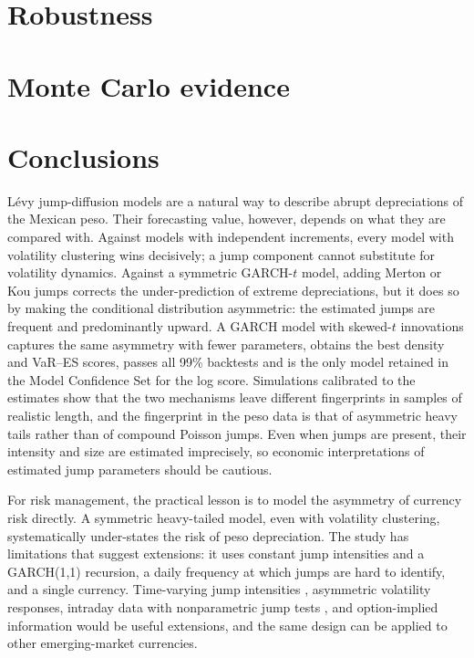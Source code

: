 \documentclass[11pt]{article}
\begin{document}
\section{Robustness}\label{sec:robust}



\section{Monte Carlo evidence}\label{sec:mc}



\section{Conclusions}\label{sec:conclusion}

Lévy jump-diffusion models are a natural way to describe abrupt depreciations of the Mexican peso. Their forecasting value, however, depends on what they are compared with. Against models with independent increments, every model with volatility clustering wins decisively; a jump component cannot substitute for volatility dynamics. Against a symmetric GARCH-$t$ model, adding Merton or Kou jumps corrects the under-prediction of extreme depreciations, but it does so by making the conditional distribution asymmetric: the estimated jumps are frequent and predominantly upward. A GARCH model with skewed-$t$ innovations captures the same asymmetry with fewer parameters, obtains the best density and VaR--ES scores, passes all 99\% backtests and is the only model retained in the Model Confidence Set for the log score. Simulations calibrated to the estimates show that the two mechanisms leave different fingerprints in samples of realistic length, and the fingerprint in the peso data is that of asymmetric heavy tails rather than of compound Poisson jumps. Even when jumps are present, their intensity and size are estimated imprecisely, so economic interpretations of estimated jump parameters should be cautious.

For risk management, the practical lesson is to model the asymmetry of currency risk directly. A symmetric heavy-tailed model, even with volatility clustering, systematically under-states the risk of peso depreciation. The study has limitations that suggest extensions: it uses constant jump intensities and a GARCH(1,1) recursion, a daily frequency at which jumps are hard to identify, and a single currency. Time-varying jump intensities \citep{chanmaheu2002,maheumccurdy2004}, asymmetric volatility responses, intraday data with nonparametric jump tests \citep{leemykland2008}, and option-implied information \citep{bates1996} would be useful extensions, and the same design can be applied to other emerging-market currencies.
\end{document}

